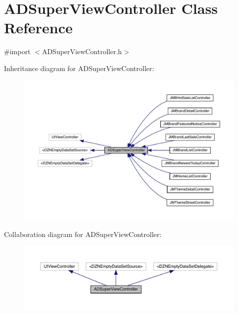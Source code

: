 \hypertarget{interface_a_d_super_view_controller}{}\section{A\+D\+Super\+View\+Controller Class Reference}
\label{interface_a_d_super_view_controller}


{\ttfamily \#import $<$A\+D\+Super\+View\+Controller.\+h$>$}



Inheritance diagram for A\+D\+Super\+View\+Controller\+:\nopagebreak
\begin{figure}[H]
\begin{center}
\leavevmode
\includegraphics[width=350pt]{interface_a_d_super_view_controller__inherit__graph}
\end{center}
\end{figure}


Collaboration diagram for A\+D\+Super\+View\+Controller\+:\nopagebreak
\begin{figure}[H]
\begin{center}
\leavevmode
\includegraphics[width=350pt]{interface_a_d_super_view_controller__coll__graph}
\end{center}
\end{figure}
